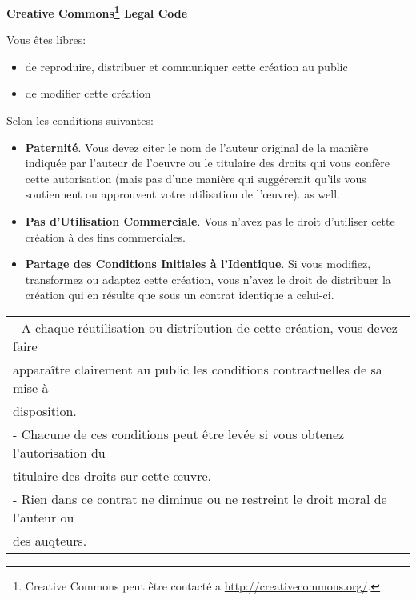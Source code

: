 \begin{center} \textbf{\LARGE{Creative Commons\footnote{Creative Commons peut être contacté a \url{http://creativecommons.org/}.} Legal Code}} \end{center}

\vspace{2cm}

Vous êtes libres:

\vspace{0.5cm}
\begin{itemize}
\item de reproduire, distribuer et communiquer cette création au public
\item de modifier cette création
\end{itemize}
\vspace{1cm}

Selon les conditions suivantes:

\vspace{0.5cm}
\begin{itemize}
\item \textbf{Paternité}. Vous devez citer le nom de l’auteur original
  de la manière indiquée par l’auteur de l’oeuvre ou le titulaire des
  droits qui vous confère cette autorisation (mais pas d’une manière
  qui suggérerait qu’ils vous soutiennent ou approuvent votre
  utilisation de l’\oe{}uvre).  as well.
\item \textbf{Pas d’Utilisation Commerciale}. Vous n’avez pas le droit
  d’utiliser cette création à des fins commerciales.
\item \textbf{Partage des Conditions Initiales à l’Identique}. Si vous
  modifiez, transformez ou adaptez cette création, vous n’avez le
  droit de distribuer la création qui en résulte que sous un contrat
  identique a celui-ci.
\end{itemize}

\vspace{1cm}
\begin{center}
  \begin{tabular}{|l|}
    \hline - A chaque réutilisation ou distribution de cette création,
    vous devez faire\\ apparaître clairement au public les conditions
    contractuelles de sa mise à\\ disposition.\\ - Chacune de ces
    conditions peut être levée si vous obtenez l’autorisation
    du\\ titulaire des droits sur cette \oe{}uvre.\\ - Rien dans ce
    contrat ne diminue ou ne restreint le droit moral de l’auteur
    ou\\ des auqteurs.\\ \hline
  \end{tabular}
\end{center}

